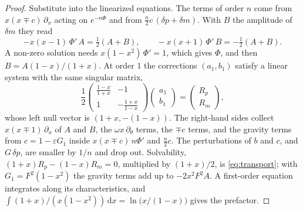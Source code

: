 \documentclass{amsart}
\numberwithin{equation}{section}
\theoremstyle{plain}
\theoremstyle{definition}
\theoremstyle{remark}
\newcommand{\eps}{\varepsilon}
\newcommand{\dd}{\mathrm{d}}
\begin{document}
\begin{proof}
Substitute into the linearized equations. The terms of order $n$ come from $x(x\mp c)\,\partial_x$ acting on
$e^{-n\Phi}$ and from $\tfrac n2 c\,(\delta p+\delta m)$. With $B$ the amplitude of $\delta m$ they read
\[
-x(x-1)\,\Phi'\,A = \tfrac12 (A+B), \qquad -x(x+1)\,\Phi'\,B = -\tfrac12 (A+B) .
\]
A non-zero solution needs $x(1-x^2)\,\Phi' = 1$, which gives $\Phi$, and then $B = A(1-x)/(1+x)$. At order $1$ the
corrections $(a_1, b_1)$ satisfy a linear system with the same singular matrix,
\[
\frac12\begin{pmatrix} \frac{1-x}{1+x} & -1 \\[2pt] 1 & -\frac{1+x}{1-x} \end{pmatrix}
\begin{pmatrix} a_1 \\ b_1 \end{pmatrix} = \begin{pmatrix} R_p \\ R_m \end{pmatrix},
\]
whose left null vector is $(1+x, -(1-x))$. The right-hand sides collect $x(x\mp1)\,\partial_x$ of $A$ and $B$, the
$\omega x\,\partial_\theta$ terms, the $\mp c$ terms, and the gravity terms from $c = 1 - \eps G_1$ inside
$x(x\mp c)\,n\Phi'$ and $\tfrac n2 c$. The perturbations of $b$ and $c$, and $G\,\delta p$, are smaller by $1/n$ and drop
out. Solvability, $(1+x)R_p - (1-x)R_m = 0$, multiplied by $(1+x)/2$, is \eqref{eq:transport}; with
$G_1 = F^2(1-x^2)$ the gravity terms add up to $-2x^2F^2A$. A first-order equation integrates along its characteristics,
and $\int (1+x)/(x(1-x^2))\,\dd x = \ln\big(x/(1-x)\big)$ gives the prefactor.
\end{proof}
\end{document}
